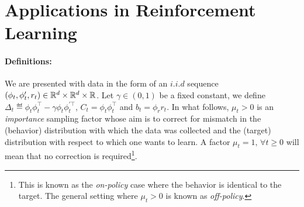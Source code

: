 \section{Applications in Reinforcement Learning}
\paragraph{Definitions:} We are presented with data in the form of an $i.i.d$ sequence $(\phi_t,\phi'_t,r_t)\in \mathbb{R}^d\times\mathbb{R}^d\times \mathbb{R}$. Let $\gamma \in (0,1)$ be a fixed constant, we define $\Delta_t\eqdef \phi_t\phi_t^\top-\gamma \phi_t\phi_t^{'\top}$, $C_t=\phi_t\phi_t^\top$ and $b_t=\phi_r r_t$. In what follows, $\mu_t>0$ is an \emph{importance} sampling factor whose aim is to correct for mismatch in the (behavior) distribution with which the data was collected and the (target) distribution with respect to which one wants to learn. A factor $\mu_t=1,\,\forall t\geq 0$ will mean that no correction is required\footnote{This is known as the \emph{on-policy} case where the behavior is identical to the target. The general setting where $\mu_t>0$ is known as \emph{off-policy}.}.
